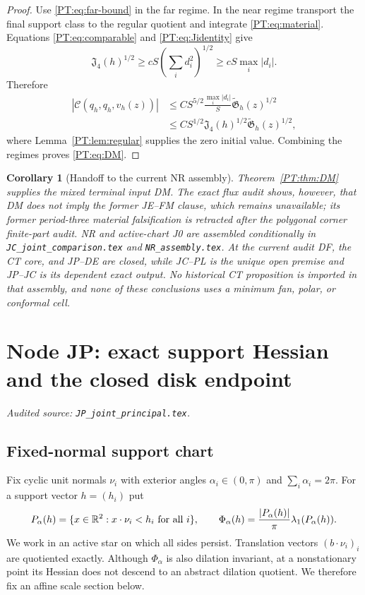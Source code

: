\documentclass[11pt]{amsart}
\numberwithin{equation}{section}
\newtheorem{corollary}[theorem]{Corollary}
\theoremstyle{definition}
\theoremstyle{remark}
\newcommand{\Jfour}{\mathfrak J_4}
\newcommand{\Gtilde}{\widetilde{\mathfrak G}}
\newcommand{\Cnull}{\mathcal C}
\begin{document}
\begin{proof}
Use \eqref{PT:eq:far-bound} in the far regime.  In the near regime transport
the final support class to the regular quotient and integrate
\eqref{PT:eq:material}.  Equations \eqref{PT:eq:comparable} and
\eqref{PT:eq:Jidentity} give
\[
 \Jfour(h)^{1/2}\ge cS\left(\sum_i d_i^2\right)^{1/2}
 \ge cS\max_i|d_i|.
\]
Therefore
\begin{align*}
 |\Cnull(q_h,q_h,v_h(z))|
 &\le CS^{5/2}\frac{\max_i|d_i|}{S}
       \Gtilde_h(z)^{1/2}\\
 &\le CS^{1/2}\Jfour(h)^{1/2}\Gtilde_h(z)^{1/2},
\end{align*}
where Lemma~\ref{PT:lem:regular} supplies the zero initial value.  Combining
the regimes proves \eqref{PT:eq:DM}.
\end{proof}

\begin{corollary}[Handoff to the current NR assembly]\label{PT:cor:J0}
Theorem~\ref{PT:thm:DM} supplies the mixed terminal input DM.  The exact flux
audit shows, however, that DM does not imply the former JE--FM clause,
which remains unavailable; its former period-three material falsification
is retracted after the polygonal corner finite-part audit.  NR and active-chart J0 are
assembled conditionally in \texttt{JC\_joint\_comparison.tex} and
\texttt{NR\_assembly.tex}.  At the current audit DF, the CT core, and
JP--DE are closed, while JC--PL is the unique open premise and JP--JC is
its dependent exact output.  No historical CT
proposition is imported in that assembly, and none of these conclusions
uses a minimum fan, polar, or conformal cell.
\end{corollary}
\endgroup

\begingroup
\section{Node JP: exact support Hessian and the closed disk endpoint}
\label{module:JP}
\noindent\textit{Audited source: \nolinkurl{JP_joint_principal.tex}.}
\subsection{Fixed-normal support chart}

Fix cyclic unit normals $\nu_i$ with exterior angles
$\alpha_i\in(0,\pi)$ and $\sum_i\alpha_i=2\pi$.  For a support vector
$h=(h_i)$ put
\begin{equation}\label{JP:eq:P}
 P_\alpha(h)=\{x\in\mathbb R^2:x\cdot\nu_i<h_i\ \hbox{for all }i\},
 \qquad
 \Phi_\alpha(h)=\frac{|P_\alpha(h)|}{\pi}\lambda_1(P_\alpha(h)).
\end{equation}
We work in an active star on which all sides persist.  Translation vectors
$(b\cdot\nu_i)_i$ are quotiented exactly.  Although $\Phi_\alpha$ is also
dilation invariant, at a nonstationary point its Hessian does not descend
to an abstract dilation quotient.  We therefore fix an affine scale section
below.
\end{document}
